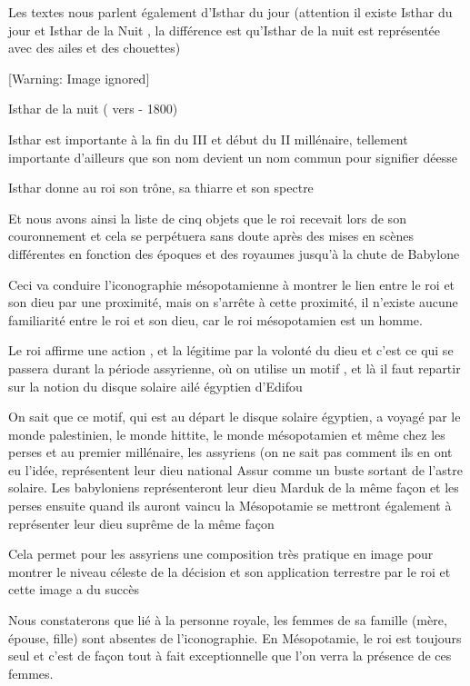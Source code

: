 \documentclass[a4paper,10pt]{article}
\begin{document}
\begin{itemize}
Les textes nous parlent également d'Isthar  du jour
(attention il existe Isthar du jour et Isthar de la Nuit , la
différence est qu'Isthar de la nuit est représentée
avec des ailes et des chouettes)

  [Warning: Image ignored] %
 

Isthar de la nuit ( vers - 1800)\ \ 

Isthar est importante à la fin du III et début du II millénaire,
tellement importante d'ailleurs que son nom devient un
nom commun pour signifier déesse

Isthar donne au roi son trône, sa thiarre et son spectre 

Et nous avons ainsi la liste de cinq objets que le roi recevait lors de
son couronnement et cela se  perpétuera sans doute après des mises en
scènes différentes en fonction des époques et des royaumes
jusqu'à la chute de Babylone

Ceci va conduire l'iconographie mésopotamienne à
montrer le lien entre le roi et son dieu par une proximité, mais on
s'arrête à cette proximité, il
n'existe aucune familiarité entre le roi et son dieu,
car le roi mésopotamien est un homme.

Le roi affirme une action , et la légitime par la volonté du dieu et
c'est ce qui se passera durant la période assyrienne,
où on utilise un motif , et là il faut repartir sur la notion du disque
solaire ailé égyptien d'Edifou

On sait que ce motif, qui est au départ le disque solaire égyptien, a
voyagé par le monde palestinien, le monde hittite, le monde
mésopotamien et même chez les perses et au premier millénaire, les
assyriens (on ne sait pas comment ils en ont eu
l'idée, représentent leur dieu national Assur comme un
buste sortant de l'astre solaire. Les babyloniens
représenteront leur dieu Marduk de la même façon et les perses ensuite
quand ils auront vaincu la Mésopotamie se mettront également à
représenter leur dieu suprême de la même façon

\newline
Cela permet pour les assyriens une composition très pratique en image
pour montrer le niveau céleste de la décision et son application 
terrestre par le roi et cette image a du succès

Nous constaterons que lié à la personne royale, les femmes de sa famille
(mère, épouse, fille) sont absentes de l'iconographie.
En Mésopotamie, le roi est toujours seul et c'est de
façon tout à fait exceptionnelle que l'on verra la 
présence de ces femmes.


\end{itemize}
\end{document}
